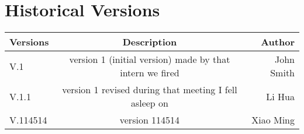 \documentclass{Atomic}
\begin{document}
\maketitle
\insertCover%
\frontmatter
\chapter{Historical Versions}

\begin{center}
\begin{tabular}{| l | c | r |}
    \hline
    Versions & Description & Author\\
    \hline
    V.1 & version 1 (initial version) made by that intern we fired & John Smith\\
    V.1.1 & version 1 revised during that meeting I fell asleep on & Li  Hua\\
    V.114514 & version 114514 & Xiao Ming\\
    \hline
\end{tabular}
\end{center}
\newpage

\tableofcontents
\mainmatter



\end{document}
